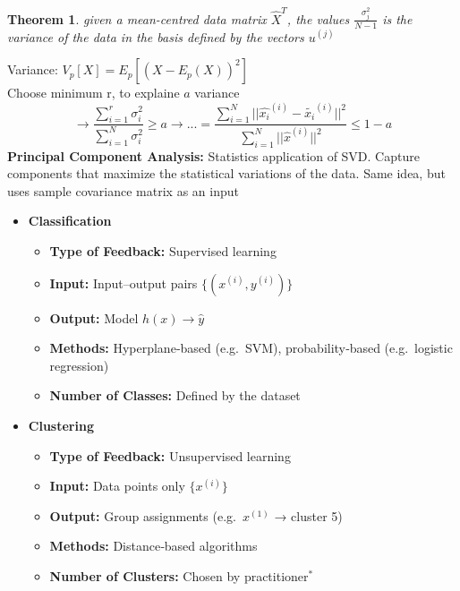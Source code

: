 \documentclass[8pt,twocolumn]{article}
\newtheorem{theorem}{Theorem}[section]
\begin{document}
\begin{theorem}
    given a mean-centred data matrix $\hat{X}^T$, the values $\frac{\sigma_j^2}{N - 1}$ is the variance of the data in the basis defined by the vectors $u^{(j)}$
\end{theorem}
Variance: $V_p[X] = E_p[(X - E_p(X))^2]$\\
Choose minimum r, to explaine $a$ variance 
\[\rightarrow \frac{\sum_{i=1}^{r}\sigma_i^2}{\sum_{i=1}^{N}\sigma_i^2} \geq a 
\rightarrow \text{...} = \frac{\sum_{i=1}^{N}||\hat{x_i}^{(i)} - \tilde{x_i}^{(i)}||^2}{\sum_{i=1}^{N} ||\hat{x}^{(i)}||^2} \leq 1 - a\]
\[\]
\textbf{Principal Component Analysis:}
Statistics application of SVD. Capture components that maximize the statistical variations of the data. Same idea, but uses sample covariance matrix as an input
\begin{itemize}
    \setlength{\itemsep}{0pt}
    \setlength{\parskip}{0pt}
    \item \textbf{Classification}
      \begin{itemize}
        \setlength{\itemsep}{0pt}
        \setlength{\parskip}{0pt}
        \item \textbf{Type of Feedback:} Supervised learning
        \item \textbf{Input:} Input–output pairs \(\{(x^{(i)},y^{(i)})\}\)
        \item \textbf{Output:} Model \(h(x)\to\hat y\)
        \item \textbf{Methods:} Hyperplane‐based (e.g.\ SVM), probability‐based (e.g.\ logistic regression)
        \item \textbf{Number of Classes:} Defined by the dataset
      \end{itemize}
    \item \textbf{Clustering}
      \begin{itemize}
        \setlength{\itemsep}{0pt}
        \setlength{\parskip}{0pt}
        \item \textbf{Type of Feedback:} Unsupervised learning
        \item \textbf{Input:} Data points only \(\{x^{(i)}\}\)
        \item \textbf{Output:} Group assignments (e.g.\ \(x^{(1)}\) → cluster 5)
        \item \textbf{Methods:} Distance‐based algorithms
        \item \textbf{Number of Clusters:} Chosen by practitioner\(^*\)
      \end{itemize}
  \end{itemize}  \vspace{-0.6em}
\end{document}
